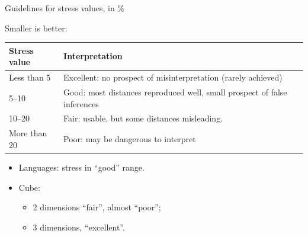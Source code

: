 \begin{frame}[fragile]{Guidelines for stress values, in \%}

Smaller is better:


\begin{tabular}{lp{3in}}
  Stress value & Interpretation \\
  \hline
  Less than 5 & Excellent: no prospect of misinterpretation (rarely achieved)\\
  5--10 & Good: most distances reproduced well, small prospect of false inferences\\
10--20 & Fair: usable, but some distances misleading.\\
More than 20 & Poor: may be dangerous to interpret\\
\hline
\end{tabular}

\begin{itemize}
\item Languages: stress in ``good'' range.
\item Cube: 
  \begin{itemize}
  \item   2 dimensions ``fair'', almost ``poor'';
  \item 3 dimensions, ``excellent''.
  \end{itemize}
\end{itemize}
  
\end{frame}

